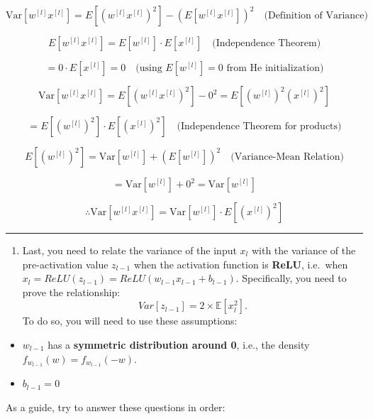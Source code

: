 \documentclass[
  letterpaper,
  DIV=11,
  numbers=noendperiod]{scrartcl}
\providecommand{\tightlist}{%
  \setlength{\itemsep}{0pt}\setlength{\parskip}{0pt}}\usepackage{longtable,booktabs,array}
\begin{document}
\[\text{Var}[w^{[l]} x^{[l]}] = E[(w^{[l]} x^{[l]})^2] - (E[w^{[l]} x^{[l]}])^2 \quad \text{(Definition of Variance)}\]

\[E[w^{[l]} x^{[l]}] = E[w^{[l]}] \cdot E[x^{[l]}] \quad \text{(Independence Theorem)}\]

\[= 0 \cdot E[x^{[l]}] = 0 \quad \text{(using } E[w^{[l]}] = 0 \text{ from He initialization)}\]

\[\text{Var}[w^{[l]} x^{[l]}] = E[(w^{[l]} x^{[l]})^2] - 0^2 = E[(w^{[l]})^2 (x^{[l]})^2]\]

\[= E[(w^{[l]})^2] \cdot E[(x^{[l]})^2] \quad \text{(Independence Theorem for products)}\]

\[E[(w^{[l]})^2] = \text{Var}[w^{[l]}] + (E[w^{[l]}])^2 \quad \text{(Variance-Mean Relation)}\]

\[= \text{Var}[w^{[l]}] + 0^2 = \text{Var}[w^{[l]}]\]

\[\therefore \text{Var}[w^{[l]} x^{[l]}] = \text{Var}[w^{[l]}] \cdot E[(x^{[l]})^2]\]

\begin{center}\rule{0.5\linewidth}{0.5pt}\end{center}

\begin{enumerate}
\def\labelenumi{\arabic{enumi}.}
\setcounter{enumi}{2}
\tightlist
\item
  Last, you need to relate the variance of the input \(x_{l}\) with the
  variance of the pre-activation value \(z_{l-1}\) when the activation
  function is \textbf{ReLU}, i.e.~when
  \(x_{l}=ReLU(z_{l-1})=ReLU(w_{l-1}x_{l-1}+b_{l-1})\). Specifically,
  you need to prove the relationship:
  \[Var[z_{l-1}]=2\times\mathbb{E}[x_{l}^{2}].\] To do so, you will need
  to use these assumptions:
\end{enumerate}

\begin{itemize}
\tightlist
\item
  \(w_{l-1}\) has a \textbf{symmetric distribution around 0}, i.e., the
  density \(f_{w_{l-1}}(w)=f_{w_{l-1}}(-w).\)
\item
  \(b_{l-1}=0\)
\end{itemize}

As a guide, try to answer these questions in order:
\end{document}
